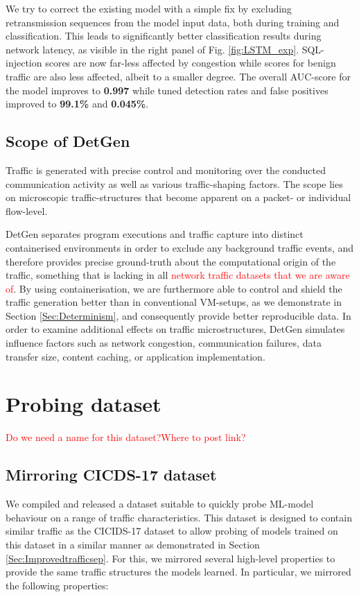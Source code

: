 \documentclass[runningheads]{llncs}
\begin{document}
We try to correct the existing model with a simple fix by excluding retransmission sequences from the model input data, both during training and classification. This leads to significantly better classification results during network latency, as visible in the right panel of Fig. \ref{fig:LSTM_exp}. SQL-injection scores are now far-less affected by congestion while scores for benign traffic are also less affected, albeit to a smaller degree.
The overall AUC-score for the model improves to \textbf{0.997} while tuned detection rates and false positives improved to \textbf{99.1\%} and \textbf{0.045\%}.


\subsection{Scope of DetGen}


Traffic is generated with precise control and monitoring over the conducted communication activity as well as various traffic-shaping factors. The scope lies on microscopic traffic-structures that become apparent on a packet- or individual flow-level.

DetGen separates program executions and traffic capture into distinct containerised environments in order to exclude any background traffic events, and therefore provides precise ground-truth about the computational origin of the traffic, something that is lacking in all \textcolor{red}{network traffic datasets that we are aware of}. By using containerisation, we are furthermore able to control and shield the traffic generation better than in conventional VM-setups, as we demonstrate in Section \ref{Sec:Determinism}, and consequently provide better reproducible data. 
In order to examine additional effects on traffic microstructures, DetGen simulates influence factors such as network congestion, communication failures, data transfer size, content caching, or application implementation.

\section{Probing dataset}\label{Sec:ProbData}
\textcolor{red}{Do we need a name for this dataset?Where to post link?}

\subsection{Mirroring CICDS-17 dataset}

We compiled and released a dataset suitable to quickly probe ML-model behaviour on a range of traffic characteristics. This dataset is designed to contain similar traffic as the CICIDS-17 \cite{sharafaldin2018toward} dataset to allow probing of models trained on this dataset in a similar manner as demonstrated in Section \ref{Sec:Improvedtrafficsep}. 
For this, we mirrored several high-level properties to provide the same traffic structures the models learned. In particular, we mirrored the following properties:
\end{document}
